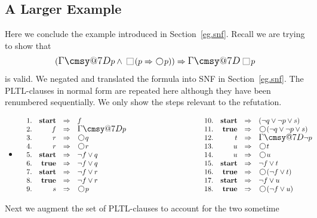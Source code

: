 \documentclass[nohyperref]{acmtrans2f}
\makeatletter
\def\sometime{\mathord{\hbox{\large$\mathchar"0\cmsy@7D$}}}
\newcommand{\always}{\raisebox{-.2ex}{
                           \mbox{\unitlength=0.9ex
                           \begin{picture}(2,2)
                           \linethickness{0.06ex}
                           \put(0,0){\line(1,0){2}}
                           \put(0,2){\line(1,0){2}}
                           \put(0,0){\line(0,1){2}}
                           \put(2,0){\line(0,1){2}}
                           \end{picture}}}
                          \,}
\newcommand{\next}{\!\raisebox{-.2ex}{ %
                        \mbox{\unitlength=0.9ex
                        \begin{picture}(2,2)
                        \linethickness{0.06ex}
                        \put(1,1){\circle{2}} %
                        \end{picture}}}       %
                        \,}
\let\imp=\Rightarrow
\def\ltrue{\hbox{\rm\bf true}}
\def\lstart{\hbox{\rm\bf start}}
\makeatother
\begin{document}
\subsection{A Larger Example}
Here we conclude the example introduced in Section~\ref{eg.snf}. Recall we are
trying to show that 
$$
(\sometime p \land \always(p \imp \next p)) \imp \sometime \always p
$$
is valid. We negated and translated the formula into SNF in
Section~\ref{eg.snf}. The PLTL-clauses in normal
form are repeated here although they have been renumbered sequentially. We
only show the steps relevant to the refutation.
\begin{itemize}
\item[] $\begin{array}{ll}
\begin{array}[t]{rrcl}
1. & \lstart & \imp & f \\
2. & f &  \imp & \sometime p \\
3. & r & \imp & \next q \\
4. & r & \imp & \next r \\
5. & \lstart & \imp & \neg f \lor q \\
6. & \ltrue & \imp & \neg f \lor q \\
7. & \lstart & \imp & \neg f \lor r \\
8. & \ltrue & \imp & \neg f \lor r \\
9. & s & \imp & \next p \\
\end{array} \qquad \qquad \qquad \qquad \qquad
\begin{array}[t]{rrcl}
10. & \lstart & \imp & (\neg q \lor \neg p \lor s) \\
11. & \ltrue & \imp & \next (\neg q \lor \neg p \lor s) \\
12. & t & \imp & \sometime \neg p \\
13. &    u & \imp & \next t \\
14. &    u & \imp & \next u \\
15. & \lstart & \imp &  \neg f \lor t \\
16. & \ltrue  & \imp &  \next (\neg f \lor t) \\
17. &   \lstart & \imp & \neg f \lor u \\
18. &   \ltrue & \imp & \next(\neg f \lor u) \\
\end{array}
\end{array}$
\end{itemize}
%
Next we augment the set of PLTL-clauses to account for the two sometime
\end{document}
